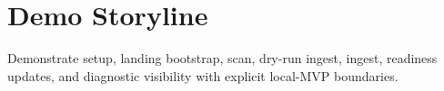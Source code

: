 \section{Demo Storyline}
Demonstrate setup, landing bootstrap, scan, dry-run ingest, ingest, readiness updates, and diagnostic visibility with explicit local-MVP boundaries.

